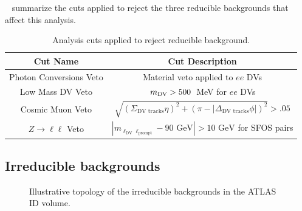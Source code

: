 ~ summarize the cuts applied to reject the three reducible backgrounds that affect this analysis.

\begin{table}[!ht]
    \centering
    \begin{tabular}{cc}
        \hline\hline
         Cut Name & Cut Description\\
         \hline
         Photon Conversions Veto & Material veto applied to $ee$ DVs\\
         Low Mass DV Veto & $m_{\mathrm{DV}}>500$~MeV for $ee$ DVs\\
         Cosmic Muon Veto & $\sqrt{(\Sigma_\text{DV tracks}\eta)^2+(\pi-|\Delta_\text{DV tracks}\phi|)^2}>.05$\\
         $Z\to\ell\ell$ Veto & $|m_{\ell_\mathrm{DV}\ell_\mathrm{prompt}}-90\text{ GeV}|>10\text{ GeV}$ for SFOS pairs \\
         \hline\hline
    \end{tabular}
    \caption{Analysis cuts applied to reject reducible background.}
    \label{tab:cuts_reducible}
\end{table}

\subsection{Irreducible backgrounds}

\begin{figure}[!ht]
    \centering
     \caption{Illustrative topology of the irreducible backgrounds in the ATLAS ID volume.}
     \label{fig:bkg_irreducible}
\end{figure}

